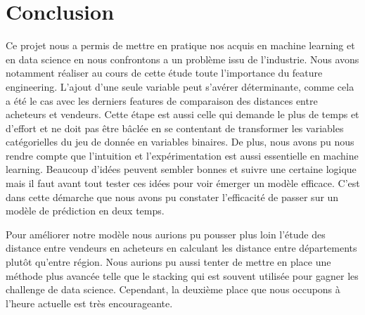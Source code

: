 
\chapter{Conclusion}

Ce projet nous a permis de mettre en pratique nos acquis en machine learning et en data 
science en nous confrontons a un problème issu de l'industrie. Nous avons notamment réaliser
au cours de cette étude toute l'importance du feature engineering. L'ajout d'une seule variable
peut s'avérer déterminante, comme cela a été le cas avec les derniers features de comparaison
des distances entre acheteurs et vendeurs. Cette étape est aussi celle qui demande le plus
de temps et d'effort et ne doit pas être bâclée en se contentant de
transformer les variables catégorielles du jeu de donnée en variables binaires. De plus,
nous avons pu nous rendre compte que l'intuition et l'expérimentation est aussi 
essentielle en machine learning. Beaucoup d'idées peuvent sembler bonnes et suivre une
certaine logique mais il faut avant tout tester ces idées pour voir émerger un modèle
efficace. C'est dans cette démarche que nous avons pu constater l'efficacité de passer
sur un modèle de prédiction en deux temps.

Pour améliorer notre modèle nous aurions pu pousser plus loin l'étude des distance entre
vendeurs en acheteurs en calculant les distance entre départements plutôt qu'entre région.
Nous aurions pu aussi tenter de mettre en place une méthode plus avancée telle que le 
stacking qui est souvent utilisée pour gagner les challenge de data science. Cependant,
la deuxième place que nous occupons à l'heure actuelle est très encourageante.
